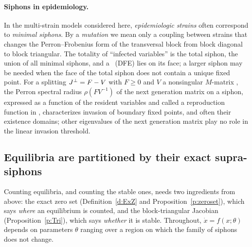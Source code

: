 \paragraph{Siphons in epidemiology.}
In the multi-strain models considered here, \emph{epidemiologic strains} often
correspond to \emph{minimal siphons}. By a \emph{mutation} we mean only a coupling
between strains that changes the Perron--Frobenius form of the transversal block
from block diagonal to block triangular. The totality of ``infected variables'' is
the total siphon, the union of all minimal siphons, and a \DFE\ (DFE) lies on its
face; a larger siphon may be needed when the face of the total siphon does not
contain a unique fixed point. For a splitting $J^\perp=F-V$ with
$F\ge0$ and $V$ a nonsingular $M$-matrix \cite{Diek,Van},
the Perron spectral radius $\rho(FV^{-1})$ of the next generation matrix on a
siphon, expressed as a function of the resident variables and called a
reproduction function in \cite{AAN,AAHJ,AABH25}, characterizes invasion of boundary
fixed points, and often their existence domains; other eigenvalues of the next
generation matrix play no role in the linear invasion threshold. 

\ifshort\else
\subsection{Equilibria are partitioned by their exact supra-siphons}
Counting equilibria, and counting the stable ones, needs two ingredients from
above: the exact zero set (Definition~\ref{d:ExZ} and
Proposition~\ref{p:zeroset}), which says \emph{where} an equilibrium is counted,
and the block-triangular Jacobian (Proposition~\ref{p:Tri}), which says
\emph{whether} it is stable. Throughout, $\dot x=f(x;\theta)$ depends on
parameters $\theta$ ranging over a region on which the family of siphons does
not change.

